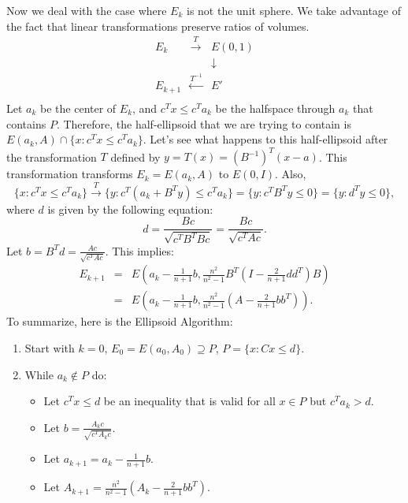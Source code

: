 \documentclass[12pt]{article}
\begin{document}
Now we deal with the case where $E_k$ is not the unit sphere. We take
advantage of the fact that linear transformations preserve ratios of
volumes.
%
\begin{equation}
\begin{array}{ccc}
E_k & \stackrel{T}{\rightarrow} & E(0, 1)\\
 & & \downarrow \\
E_{k+1} & \stackrel{T^{-1}}{\leftarrow} & E' \\
\end{array}
\end{equation}
%
Let $a_k$ be the center of $E_k$, and $c^Tx \leq c^Ta_k$ be the
halfspace through $a_k$ that contains $P$. Therefore, the
half-ellipsoid that we are trying to contain is $E(a_k, A)\cap \{x :
c^Tx \leq c^Ta_k\}$. Let's see what happens to this half-ellipsoid
after the transformation $T$ defined by $y= T(x)=(B^{-1})^T (x-a)$. This
transformation transforms $E_k=E(a_k, A)$ to $E(0,I)$. Also,
%
\begin{equation}
\{x: c^Tx \leq c^Ta_k\}  \stackrel{T}{\rightarrow} 
\{ y: c^T(a_k +
B^Ty) \leq c^T a_k\}  = \{y: c^TB^Ty \leq 0 \} = \{y: d^Ty \leq 0\},
\end{equation}
%
where $d$ is given by the following equation:
%
\begin{equation}
d = \frac{Bc}{\sqrt{c^T B^T B c}} = \frac{Bc}{\sqrt{c^T A c}}.
\end{equation}
%
Let $b = B^Td = \frac{Ac}{\sqrt{c^T A c}}$. This implies:
%
\begin{eqnarray}
E_{k+1} & = & E\left(a_k - \frac{1}{n + 1}b, \frac{n^2}{n^2 - 1}
B^T\left(I-\frac{2}{n+1}d d^T\right)B\right) \\ 
& = & E\left(a_k - \frac{1}{n + 1}b, \frac{n^2}{n^2 -
1}\left(A-\frac{2}{n+1}bb^T\right)\right).
\end{eqnarray}
%
To summarize, here is the Ellipsoid Algorithm:
%
\begin{enumerate}
\item 
Start with $k=0$, $E_0 = E(a_0, A_0) \supseteq P$, $P = \{x : Cx \leq
d\}$.
\item While $a_k \not\in P$ do:
\begin{itemize}
\item 
Let $c^Tx \leq d$ be an inequality that is valid for all $x
\in P$ but $c^Ta_k>d$.
\item Let $b = \frac{A_kc}{\sqrt{c^TA_k c}}$.
\item Let $a_{k + 1} = a_k - \frac{1}{n+1}b$.
\item Let $A_{k + 1} = \frac{n^2}{n^2 - 1}(A_k - \frac{2}{n+1} b b^T)$.
\end{itemize}
\end{enumerate}
\end{document}
